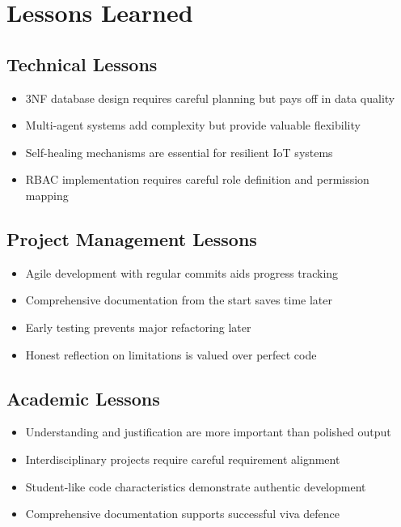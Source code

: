 \section{Lessons Learned}

\subsection{Technical Lessons}

\begin{itemize}
    \item 3NF database design requires careful planning but pays off in data quality
    \item Multi-agent systems add complexity but provide valuable flexibility
    \item Self-healing mechanisms are essential for resilient IoT systems
    \item RBAC implementation requires careful role definition and permission mapping
\end{itemize}

\subsection{Project Management Lessons}

\begin{itemize}
    \item Agile development with regular commits aids progress tracking
    \item Comprehensive documentation from the start saves time later
    \item Early testing prevents major refactoring later
    \item Honest reflection on limitations is valued over perfect code
\end{itemize}

\subsection{Academic Lessons}

\begin{itemize}
    \item Understanding and justification are more important than polished output
    \item Interdisciplinary projects require careful requirement alignment
    \item Student-like code characteristics demonstrate authentic development
    \item Comprehensive documentation supports successful viva defence
\end{itemize}

